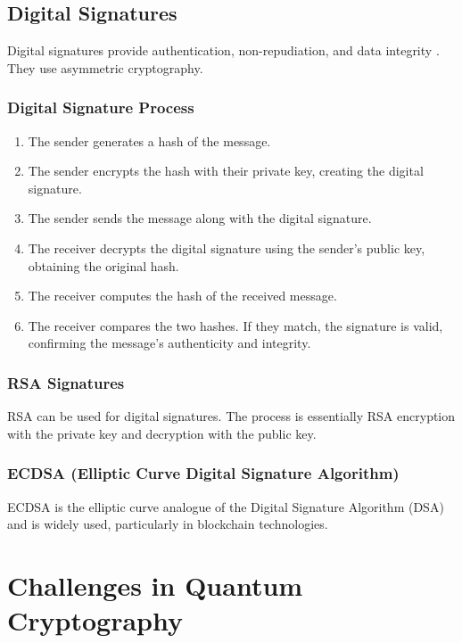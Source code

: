 \documentclass{report}
\begin{document}
\section{Digital Signatures}
\label{sec:digital-signatures}

Digital signatures provide authentication, non-repudiation, and data integrity \cite{menezes_signatures}.  They use asymmetric cryptography.

\subsection{Digital Signature Process}
\label{subsec:signature-process}

\begin{enumerate}
    \item The sender generates a hash of the message.
    \item The sender encrypts the hash with their private key, creating the digital signature.
    \item The sender sends the message along with the digital signature.
    \item The receiver decrypts the digital signature using the sender's public key, obtaining the original hash.
    \item The receiver computes the hash of the received message.
    \item The receiver compares the two hashes. If they match, the signature is valid, confirming the message's authenticity and integrity.
\end{enumerate}

\subsection{RSA Signatures}
\label{subsec:rsa-signatures}

RSA can be used for digital signatures.  The process is essentially RSA encryption with the private key and decryption with the public key.

\subsection{ECDSA (Elliptic Curve Digital Signature Algorithm)}
\label{subsec:ecdsa}

ECDSA is the elliptic curve analogue of the Digital Signature Algorithm (DSA) and is widely used, particularly in blockchain technologies.

\chapter{Challenges in Quantum Cryptography}
\end{document}
